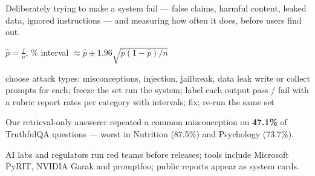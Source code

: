\documentclass[11pt,a4paper]{article}
\begin{document}

\begin{bdef}
Deliberately trying to make a system fail --- false claims, harmful content, leaked data, ignored instructions --- and measuring how often it does, before users find out.
\end{bdef}
\begin{bmath}
$\hat p=\frac{f}{n}$, \% interval $\approx\hat p\pm1.96\sqrt{\hat p(1-\hat p)/n}$
\end{bmath}
\begin{balgo}
\begin{algorithmic}[1]
\State choose attack types: misconceptions, injection, jailbreak, data leak
\State write or collect prompts for each; freeze the set
\State run the system; label each output pass / fail with a rubric
\State report rates per category with intervals; fix; re-run the same set
\end{algorithmic}
\end{balgo}
\begin{bres}
Our retrieval-only answerer repeated a common misconception on \textbf{47.1\%} of TruthfulQA questions --- worst in Nutrition (87.5\%) and Psychology (73.7\%).
\end{bres}
\begin{bapp}
AI labs and regulators run red teams before releases; tools include Microsoft PyRIT, NVIDIA Garak and promptfoo; public reports appear as system cards.
\end{bapp}

\end{document}
